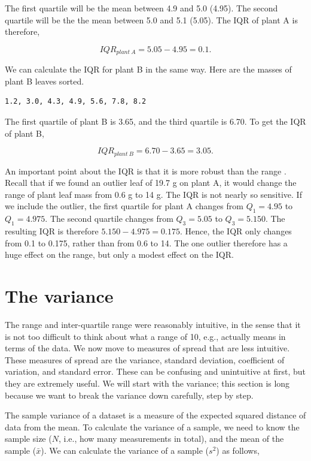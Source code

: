 \documentclass[
]{scrbook}
\begin{document}
The first quartile will be the mean between 4.9 and 5.0 (4.95).
The second quartile will be the the mean between 5.0 and 5.1 (5.05).
The IQR of plant A is therefore,

\[IQR_{plant\:A} = 5.05 - 4.95 = 0.1.\]

We can calculate the IQR for plant B in the same way.
Here are the masses of plant B leaves sorted.

\begin{verbatim}
1.2, 3.0, 4.3, 4.9, 5.6, 7.8, 8.2
\end{verbatim}

The first quartile of plant B is 3.65, and the third quartile is 6.70.
To get the IQR of plant B,

\[IQR_{plant\:B} = 6.70 - 3.65 = 3.05.\]

An important point about the IQR is that it is more robust than the range \citep{Dytham2011}.
Recall that if we found an outlier leaf of 19.7 g on plant A, it would change the range of plant leaf mass from 0.6 g to 14 g.
The IQR is not nearly so sensitive.
If we include the outlier, the first quartile for plant A changes from \(Q_{1} = 4.95\) to \(Q_{1} = 4.975\).
The second quartile changes from \(Q_{3} = 5.05\) to \(Q_{3} = 5.150\).
The resulting IQR is therefore \(5.150 - 4.975 = 0.175\).
Hence, the IQR only changes from 0.1 to 0.175, rather than from 0.6 to 14.
The one outlier therefore has a huge effect on the range, but only a modest effect on the IQR.

\hypertarget{the-variance}{%
\section{The variance}\label{the-variance}}

The range and inter-quartile range were reasonably intuitive, in the sense that it is not too difficult to think about what a range of 10, e.g., actually means in terms of the data.
We now move to measures of spread that are less intuitive.
These measures of spread are the variance, standard deviation, coefficient of variation, and standard error.
These can be confusing and unintuitive at first, but they are extremely useful.
We will start with the variance; this section is long because we want to break the variance down carefully, step by step.

The sample variance of a dataset is a measure of the expected squared distance of data from the mean.
To calculate the variance of a sample, we need to know the sample size (\(N\), i.e., how many measurements in total), and the mean of the sample (\(\bar{x}\)).
We can calculate the variance of a sample (\(s^{2}\)) as follows,
\end{document}
